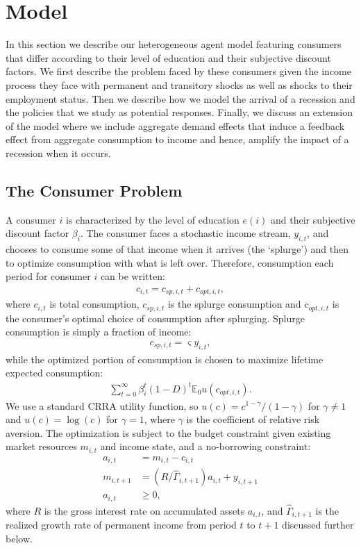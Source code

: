 \documentclass[../HAFiscal]{subfiles}
\begin{document}
	
\section{Model}

In this section we describe our heterogeneous agent model featuring consumers that differ according to their level of education and their subjective discount factors. We first describe the problem faced by these consumers given the income process they face with permanent and transitory shocks as well as shocks to their employment status. Then we describe how we model the arrival of a recession and the policies that we study as potential responses. Finally, we discuss an extension of the model where we include aggregate demand effects that induce a feedback effect from aggregate consumption to income and hence, amplify the impact of a recession when it occurs. 

\subsection{The Consumer Problem}
A consumer $i$ is characterized by the level of education $e(i)$ and their subjective discount factor $\beta_i$. The consumer faces a stochastic income stream, $y_{i,t}$, and chooses to consume some of that income when it arrives (the `splurge') and then to optimize consumption with what is left over. Therefore, consumption each period for consumer $i$ can be written:
\begin{align}
	c_{i,t} = c_{sp,i,t} + c_{opt,i,t},
\end{align}
where $c_{i,t}$ is total consumption, $c_{sp,i,t}$ is the splurge consumption and $c_{opt,i,t}$ is the consumer's optimal choice of consumption after splurging. Splurge consumption is simply a fraction of income:
\begin{align}
c_{sp,i,t} = \varsigma y_{i,t},
\end{align}
while the optimized portion of consumption is chosen to maximize lifetime expected consumption:
\begin{align}
\sum_{t=0}^{\infty}\beta_i^t (1-D)^t \mathbb{E}_0 u(c_{opt,i,t}).
\end{align}
We use a standard CRRA utility function, so $u(c) = c^{1-\gamma}/(1-\gamma)$ for $\gamma \neq 1$ and $u(c) = \log(c)$ for $\gamma=1$, where $\gamma$ is the coefficient of relative risk aversion. The optimization is subject to the budget constraint given existing market resources $m_{i,t}$ and income state, and a no-borrowing constraint: 
\begin{align}
	a_{i,t} &= m_{i,t} - c_{i,t} \\ 
	m_{i,t+1} &= (R/\hat{\Gamma}_{i,t+1}) a_{i,t} + y_{i,t+1} \\
	a_{i,t} &\geq 0,  
\end{align}
where $R$ is the gross interest rate on accumulated assets $a_{i,t}$, and $\hat{\Gamma}_{i,t+1}$ is the realized growth rate of permanent income from period $t$ to $t+1$ discussed further below.
\end{document}
